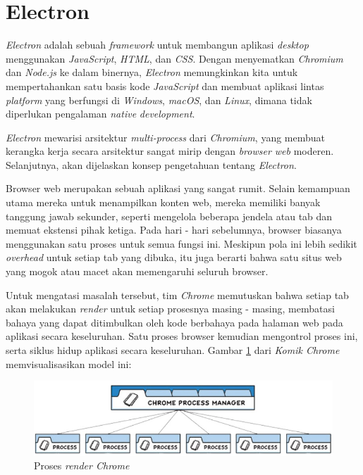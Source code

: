 \newpage
\section{Electron}
\textit{Electron} adalah sebuah \textit{framework} untuk membangun aplikasi \textit{desktop} menggunakan \textit{JavaScript}, \textit{HTML}, dan \textit{CSS}. Dengan menyematkan \textit{Chromium} dan \textit{Node.js} ke dalam binernya, \textit{Electron} memungkinkan kita untuk mempertahankan satu basis kode \textit{JavaScript} dan membuat aplikasi lintas \textit{platform} yang berfungsi di \textit{Windows}, \textit{macOS}, dan \textit{Linux}, dimana tidak diperlukan pengalaman \textit{native} \textit{development}. \cite{electron}

\textit{Electron} mewarisi arsitektur \textit{multi-process} dari \textit{Chromium}, yang membuat kerangka kerja secara arsitektur sangat mirip dengan \textit{browser web} moderen. Selanjutnya, akan dijelaskan konsep pengetahuan tentang \textit{Electron}.

Browser web merupakan sebuah aplikasi yang sangat rumit. Selain kemampuan utama mereka untuk menampilkan konten web, mereka memiliki banyak tanggung jawab sekunder, seperti mengelola beberapa jendela atau tab dan memuat ekstensi pihak ketiga. Pada hari - hari sebelumnya, browser biasanya menggunakan satu proses untuk semua fungsi ini. Meskipun pola ini lebih sedikit \textit{overhead} untuk setiap tab yang dibuka, itu juga berarti bahwa satu situs web yang mogok atau macet akan memengaruhi seluruh browser.

Untuk mengatasi masalah tersebut, tim \textit{Chrome} memutuskan  bahwa setiap tab akan melakukan \textit{render} untuk setiap prosesnya masing - masing, membatasi bahaya yang dapat ditimbulkan oleh kode berbahaya pada halaman web pada aplikasi secara keseluruhan. Satu proses browser kemudian mengontrol proses ini, serta siklus hidup aplikasi secara keseluruhan. Gambar \ref{fig:gambar15} dari \textit{Komik Chrome} memvisualisasikan model ini:

\begin{figure}[H]
    \centering
    \includegraphics[]{Gambar/Rendered Processes.jpg}
    \caption{Proses \textit{render Chrome}}
    \label{fig:gambar15}
\end{figure}

